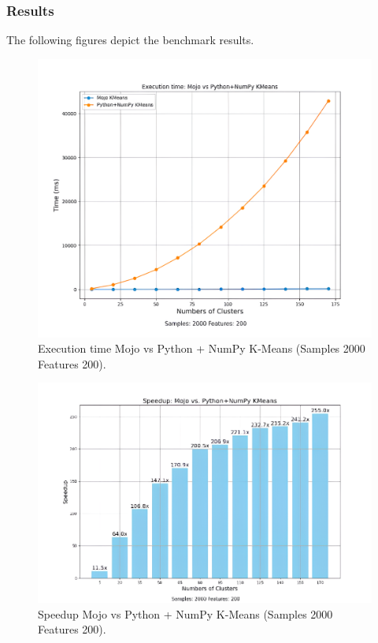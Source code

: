 \documentclass[conference]{IEEEtran}
\begin{document}
\subsubsection{Results}
The following figures depict the benchmark results.
\begin{figure}[h]
    \centerline{\includegraphics[width=\linewidth]{fig1.png}}
    \caption{Execution time   Mojo vs Python + NumPy K-Means (Samples 2000 Features 200).}
    \label{fig1}
\end{figure}

\begin{figure}[h]
    \centerline{\includegraphics[width=\linewidth]{fig2.png}}
    \caption{Speedup   Mojo vs Python + NumPy K-Means (Samples 2000 Features 200).}
    \label{fig2}
\end{figure}
\end{document}
